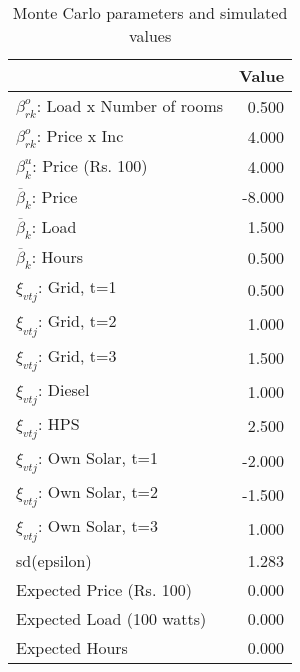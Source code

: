 \begin{table}[!ht]
	\centering
		\caption{Monte Carlo parameters and simulated values}
\begin{tabular}{lr}
		\toprule
               &     Value\\
		\midrule
		$\beta^o_{rk}$: Load x Number of rooms&     0.500\\
		$\beta^o_{rk}$: Price x Inc&     4.000\\
		$\beta^u_{k}$: Price (Rs. 100)&     4.000\\
		$\overline{\beta}_k$: Price&    -8.000\\
		$\overline{\beta}_k$: Load&     1.500\\
		$\overline{\beta}_k$: Hours&     0.500\\
		$\xi_{vtj}$: Grid, t=1&     0.500\\
		$\xi_{vtj}$: Grid, t=2&     1.000\\
		$\xi_{vtj}$: Grid, t=3&     1.500\\
		$\xi_{vtj}$: Diesel&     1.000\\
		$\xi_{vtj}$: HPS&     2.500\\
		$\xi_{vtj}$: Own Solar, t=1&    -2.000\\
		$\xi_{vtj}$: Own Solar, t=2&    -1.500\\
		$\xi_{vtj}$: Own Solar, t=3&     1.000\\
		    sd(epsilon)&     1.283\\
		Expected Price (Rs. 100)&     0.000\\
		Expected Load (100 watts)&     0.000\\
		 Expected Hours&     0.000\\
		\bottomrule
	\end{tabular}
\end{table}
